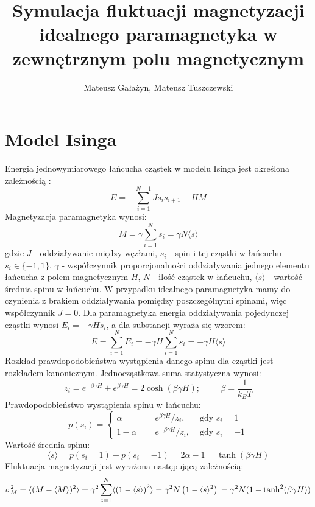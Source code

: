 \documentclass[a4paper,10pt]{article}
\author{Mateusz Gałażyn, Mateusz Tuszczewski}
\title{Symulacja fluktuacji magnetyzacji idealnego paramagnetyka w zewnętrznym polu magnetycznym}
\begin{document}
	\maketitle
	\section{Model Isinga}
	Energia jednowymiarowego łańcucha cząstek w modelu Isinga jest określona zależnością \cite{az}:
	\[ E = -\sum^{N-1}_{i=1} J s_{i} s_{i+1} - H M \]
	Magnetyzacja paramagnetyka wynosi:
	\[ M = \gamma \sum^{N}_{i=1}s_{i} = \gamma N \langle s \rangle \]
	gdzie $J$ - oddziaływanie między węzłami, $s_{i}$ - spin i-tej cząstki w łańcuchu $s_{i} \in \{-1,1\}$, $\gamma$ - współczynnik proporcjonalności oddziaływania jednego elementu łańcucha z polem magnetycznym $H$, $N$ - ilość cząstek w łańcuchu, $\langle s \rangle$ - wartość średnia spinu w łańcuchu. W przypadku idealnego paramagnetyka mamy do czynienia z brakiem oddziaływania pomiędzy poszczególnymi spinami, więc współczynnik $J = 0$. Dla paramagnetyka energia oddziaływania pojedynczej cząstki wynosi $E_i = - \gamma H s_{i}$, a dla substancji wyraża się wzorem:
	\[ E = \sum^{N}_{i=1} E_{i} =-\gamma H \sum^{N}_{i=1}s_{i} = -\gamma H \langle s \rangle\]
	Rozkład prawdopodobieństwa wystąpienia danego spinu dla cząstki jest rozkładem kanonicznym. Jednocząstkowa suma statystyczna wynosi\cite{az}:
	\[ z_{i} = e^{- \beta \gamma H } + e^{\beta \gamma H} = 2 \cosh(\beta \gamma H); \hspace{1cm} \beta = \frac{1}{k_{B}T}  \]
	Prawdopodobieństwo wystąpienia spinu w łańcuchu:
	\[
	p(s_i) = \left\{ \begin{array}{lll}
	\alpha & = e^{\beta \gamma H} / z_{i}, & \mbox{ gdy } s_i = 1 \\
	1-\alpha & = e^{ -\beta \gamma H} / z_{i}, & \mbox{ gdy } s_i = -1
	\end{array} \right.
	\]
	Wartość średnia spinu:
	\[ \langle s \rangle = p(s_i=1) - p(s_i=-1) = 2 \alpha -1 = \tanh (\beta \gamma H) \]
	Fluktuacja magnetyzacji jest wyrażona następującą zależnością\cite{af}:
	\[ \sigma_{M}^{2} = \langle (M-\langle M \rangle)^{2}\rangle = \gamma^{2} \sum^{N}_{i=1} \langle \left( 1-\langle s \rangle \right)^{2} \rangle  = \gamma^{2} N  \left( 1 - \langle s \rangle^{2} \right) \\ = \gamma^{2} N (1-\tanh^{2} (\beta \gamma H)) \]
\end{document}
